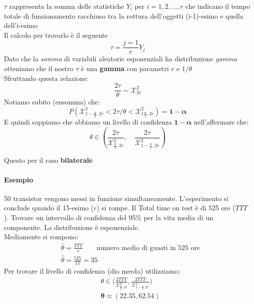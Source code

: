 \documentclass[]{article}
\begin{document}
    $\tau$ rappresenta la somma delle statistiche $Y_i$ per $i=1,2,\ldots,r$ che indicano il tempo totale di funzionamento racchiuso tra la rottura dell'oggetti (i-1)-esimo e quella dell'i-esimo \\
    Il calcolo per trovarlo è il seguente 
    \[ \tau = \frac{j=1}{r} Y_j \]
    Dato che la \textit{somma} di variabili aleatorie esponenziali ha distribuzione \textit{gamma} otteniamo che il nostro $\tau$ è una \textbf{gamma} con parametri $r$ e $1 / \theta$ \\
    Sfruttando questa relazione:
    \[ \frac{2 \tau}{\theta} \sim \mathcal{X}^2_{2r} \]
    Notiamo subito (ensomma) che:
    \[ P(\mathcal{X}^2_{1-\frac{\alpha}{2}, 2r} < 2 \tau / \theta < \mathcal{X}^2_{1\frac{\alpha}{2}, 2r}) = \boldsymbol{1 -\alpha} \]
    E quindi sappiamo che abbiamo un livello di confidenza $\boldsymbol{1- \alpha}$ nell'affermare che:
    \[ \theta \in \left( \frac{2 \tau}{\mathcal{X}^2_{\frac{\alpha}{2}, 2r}}, \quad \frac{2\tau}{\mathcal{X}^2_{1- \frac{\alpha}{2}, 2r}} \right) \]
    \centerline{Questo per il caso \textbf{bilaterale}}
    \paragraph{Esempio} 50 transistor vengono messi in funzione simultaneamente. L'esperimento si conclude quando il 15-esimo ($r$) si rompe.
    Il Total time on test è di 525 ore ($TTT$). Trovare un intervallo di confidenza del 95\% per la vita media di un componente.
    La distribuzione è esponenziale. \\
    Mediamente si rompono:
    \begin{equation*}
        \begin{split}
            &\hat \theta = \frac{TTT}{r} \qquad \text{numero medio di guasti in 525 ore} \\
            &\hat \theta = \frac{525}{15} = 35
        \end{split}
    \end{equation*}
    Per trovare il livello di confidenza (dio merda) utilizziamo:
    \begin{equation*}
        \begin{split}
            &\theta \in \Big(\frac{2TTT}{\mathcal{X}^2_{\frac{\alpha}{2},2r}},\frac{2TTT}{\mathcal{X}^2_{1-\frac{\alpha}{2},2r}}   \Big) \\[2ex]
            &\boldsymbol{\theta \approx (22.35, 62.54)}
        \end{split}
    \end{equation*}
\end{document}
